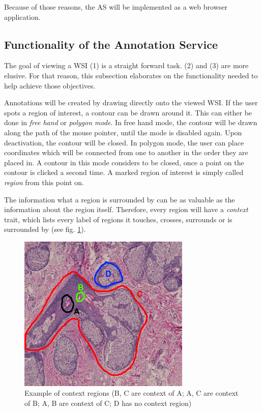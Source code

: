 Because of those reasons, the AS will be implemented as a web browser application. 


\subsection{Functionality of the Annotation Service}
\label{sec4_functions}
The goal of viewing a WSI (1) is a straight forward task. (2) and (3) are more elusive. For that reason, this subsection elaborates on the functionality needed to help achieve those objectives.

Annotations will be created by drawing directly onto the viewed WSI. If the user spots a region of interest, a contour can be drawn around it. This can  either be done in \emph{free hand} or \emph{polygon mode}. In free hand mode, the contour will be drawn along the path of the mouse pointer, until the mode is disabled again. Upon deactivation, the contour will be closed. In polygon mode, the user can place coordinates which will be connected from one to another in the order they are placed in. A contour in this mode considers to be closed, once a point on the contour is clicked a second time. A marked region of interest is simply called \emph{region} from this point on.

The information what a region is surrounded by can be as valuable as the information about the region itself\cite{Bankman00}. Therefore, every region will have a \emph{context} trait, which lists every label of regions it touches, crosses, surrounds or is surrounded by (see fig. \ref{fig4_contextregions}).

\begin{figure}[H]
	\begin{center}
		\includegraphics[scale=0.5]{img/contextregions.png}
		\caption{Example of context regions (B, C are context of A; A, C are context of B; A, B are context of C; D has no context region)}
		\label{fig4_contextregions}
	\end{center}
\end{figure}

